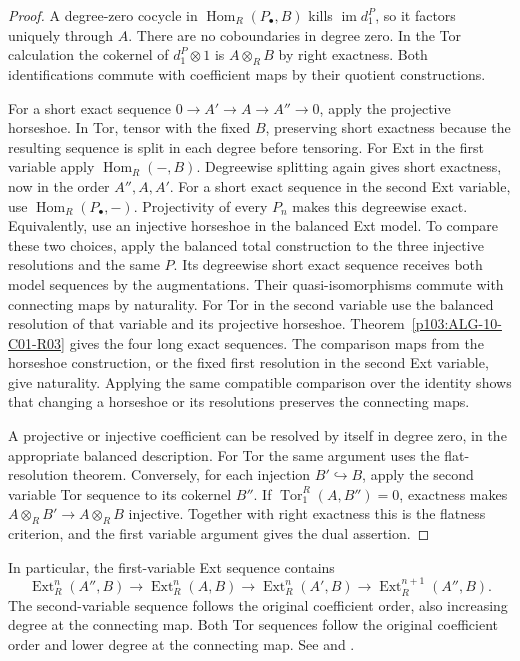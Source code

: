 \documentclass[11pt,oneside,openany]{book}
\theoremstyle{definition}
\theoremstyle{remark}
\begin{document}
\begin{proof}
A degree-zero cocycle in \(\operatorname{Hom}_R(P_\bullet,B)\)
kills \(\operatorname{im}d_1^P\), so it factors uniquely
through \(A\). There are no coboundaries in degree zero.
In the Tor calculation the cokernel of \(d_1^P\otimes1\)
is \(A\otimes_R B\) by right exactness. Both identifications
commute with coefficient maps by their quotient constructions.

For a short exact sequence \(0\to A'\to A\to A''\to0\),
apply the projective horseshoe. In Tor, tensor with the
fixed \(B\), preserving short exactness because the resulting
sequence is split in each degree before tensoring. For Ext in
the first variable apply \(\operatorname{Hom}_R(-,B)\).
Degreewise splitting again gives short exactness, now in the
order \(A'',A,A'\). For a short exact sequence in the second
Ext variable, use \(\operatorname{Hom}_R(P_\bullet,-)\).
Projectivity of every \(P_n\) makes this degreewise exact.
Equivalently, use an injective horseshoe in the balanced Ext
model. To compare these two choices, apply the balanced total
construction to the three injective resolutions and the same \(P\).
Its degreewise short exact sequence receives both model sequences
by the augmentations. Their quasi-isomorphisms commute with
connecting maps by naturality. For Tor in the second variable use the balanced
resolution of that variable and its projective horseshoe.
Theorem~\ref{p103:ALG-10-C01-R03} gives the four long exact
sequences. The comparison maps from the horseshoe construction,
or the fixed first resolution in the second Ext variable, give
naturality. Applying the same compatible comparison over the
identity shows that changing a horseshoe or its resolutions
preserves the connecting maps.

A projective or injective coefficient can be resolved by itself
in degree zero, in the appropriate balanced description. For Tor
the same argument uses the flat-resolution theorem. Conversely,
for each injection \(B'\hookrightarrow B\), apply the second
variable Tor sequence to its cokernel \(B''\). If
\(\operatorname{Tor}_1^R(A,B'')=0\), exactness makes
\(A\otimes_R B'\to A\otimes_R B\) injective. Together with
right exactness this is the flatness criterion, and the first
variable argument gives the dual assertion.
\end{proof}

In particular, the first-variable Ext sequence contains
\[
 \operatorname{Ext}^n_R(A'',B)\longrightarrow\operatorname{Ext}^n_R(A,B)
 \longrightarrow\operatorname{Ext}^n_R(A',B)
 \longrightarrow\operatorname{Ext}^{n+1}_R(A'',B).
\]
The second-variable sequence follows the original coefficient
order, also increasing degree at the connecting map. Both Tor
sequences follow the original coefficient order and lower degree
at the connecting map. See \cite[\S\S2.4--2.5 and 3.2]{weibel}
and \cite[\S\S6.2 and 7.1]{rotman}.
\end{document}
